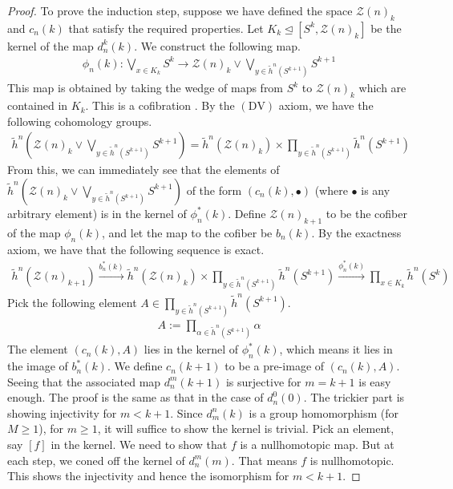 \documentclass[12pt, notitlepage]{article}
\theoremstyle{definition}
\newcommand{\calz}{\mathcal{Z}}
\newcommand{\redco}{\widetilde{h}}
\newcommand{\dv}{\mathrm{DV}}
\begin{document}
\begin{proof}
  To prove the induction step, suppose we have defined the space $\calz(n)_k$ and $c_n(k)$ that
  satisfy the required properties. Let $K_k \trianglelefteq \left[ S^k, \calz(n)_k \right]$
   be the kernel of the map $d_n^k(k)$.  We construct the following map.
  \begin{align*}
    \phi_n(k): \bigvee_{x \in K_k} S^k \to \calz(n)_k \vee \bigvee_{y \in \redco^n(S^{k+1})} S^{k+1}
  \end{align*}
  This map is obtained by taking the wedge of maps from $S^k$ to $\calz(n)_k$ which are contained in
  $K_k$.  This is a cofibration . By the $(\dv)$ axiom, we have the following cohomology
  groups.
  \begin{align*}
    \redco^n \left( \calz(n)_k \vee \bigvee_{y \in \redco^n(S^{k+1})} S^{k+1} \right) = \redco^n(\calz(n)_k) \times \prod_{y \in \redco^n(S^{k+1})} \redco^n(S^{k+1})
  \end{align*}
  From this, we can immediately see that the elements of
  $\redco^n \left( \calz(n)_k \vee \bigvee_{y \in \redco^n(S^{k+1})} S^{k+1} \right)$ of the form
  $(c_n(k), \bullet)$ (where $\bullet$ is any arbitrary element) is in the kernel of
  $\phi_n^{\ast}(k)$.  Define $\calz(n)_{k+1}$ to be the cofiber of the map $\phi_n(k)$, and let the
  map to the cofiber be $b_n(k)$.  By the exactness axiom, we have that the following sequence is
  exact.
  \begin{align*}
    \redco^n(\calz(n)_{k+1}) \xrightarrow{b_n^{\ast}(k)}  \redco^n(\calz(n)_k) \times \prod_{y \in \redco^n(S^{k+1})} \redco^n(S^{k+1})
    \xrightarrow{\phi_n^{\ast}(k)} \prod_{x \in K_k} \redco^n(S^k)
  \end{align*}
  Pick the following element $A \in \prod_{y \in \redco^n(S^{k+1})} \redco^n(S^{k+1})$.
  \begin{align*}
    A := \prod_{\alpha \in \redco^n(S^{k+1})} \alpha
  \end{align*}
  The element $(c_n(k), A)$ lies in the kernel of $\phi_n^{\ast}(k)$, which means it lies in the
  image of $b_n^{\ast}(k)$. We define $c_n(k+1)$ to be a pre-image of $(c_n(k), A)$. Seeing that the
  associated map $d_n^m(k+1)$ is surjective for $m=k+1$ is easy enough. The proof is the same as
  that in the case of $d_n^0(0)$. The trickier part is showing injectivity for $m < k+1$. Since $d_m^n(k)$ is
  a group homomorphism (for $M \geq 1$), for $m \geq 1$, it will suffice to show the kernel is
  trivial.    Pick an element, say $[f]$ in the
  kernel. We need to show that $f$ is a nullhomotopic map. But at each step, we coned off the kernel
  of $d_n^m(m)$. That means $f$ is nullhomotopic. This shows the injectivity and hence the
  isomorphism for $m < k+1$.


\end{proof}
\end{document}
